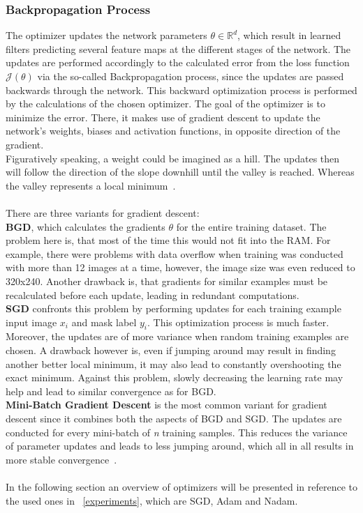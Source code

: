 \subsubsection{Backpropagation Process}
The optimizer updates the network parameters $\theta \in \mathbb{R}^d$, which result in learned filters predicting several feature maps at
the different stages of the network.
The updates are performed accordingly to the calculated error from the loss function $\mathcal{J}(\theta)$ via the
so-called Backpropagation process, since the updates are passed backwards through the network.
This backward optimization process is performed by the calculations of the chosen optimizer.
The goal of the optimizer is to minimize the error.
There, it makes use of gradient descent to update the network's weights, biases and activation functions, in opposite direction
of the gradient.\\
Figuratively speaking, a weight could be imagined as a hill.
The updates then will follow the direction of the slope downhill until the valley is reached.
Whereas the valley represents a local minimum~\cite{optimizersoverview}.
\\\mbox{}\\
There are three variants for gradient descent:\\
\textbf{\gls{BGD}}, which calculates the gradients $\theta$ for the entire training dataset.
The problem here is, that most of the time this would not fit into the RAM.
For example, there were problems with data overflow when training was conducted with more than 12 images at a time, however, the image size was even reduced
to 320x240.
Another drawback is, that gradients for similar examples must be recalculated before each update, leading in redundant computations.\\
\textbf{\gls{SGD}} confronts this problem by performing updates for each training example input image $x_i$
and mask label $y_i$.
This optimization process is much faster.
Moreover, the updates are of more variance when random training examples are chosen.
A drawback however is, even if jumping around may result in finding another better local minimum, it may also
lead to constantly overshooting the exact minimum.
Against this problem, slowly decreasing the learning rate may help and lead to similar convergence as for BGD.\\
\textbf{Mini-Batch Gradient Descent} is the most common variant for gradient descent since it combines both the aspects of
BGD and SGD.
The updates are conducted for every mini-batch of \textit{n} training samples.
This reduces the variance of parameter updates and leads to less jumping around, which all in all results in more stable
convergence~\cite{optimizersoverview}.
\\\mbox{}\\
In the following section an overview of optimizers will be presented in reference to the used ones in ~\autoref{experiments}, which are
SGD, Adam and Nadam.


